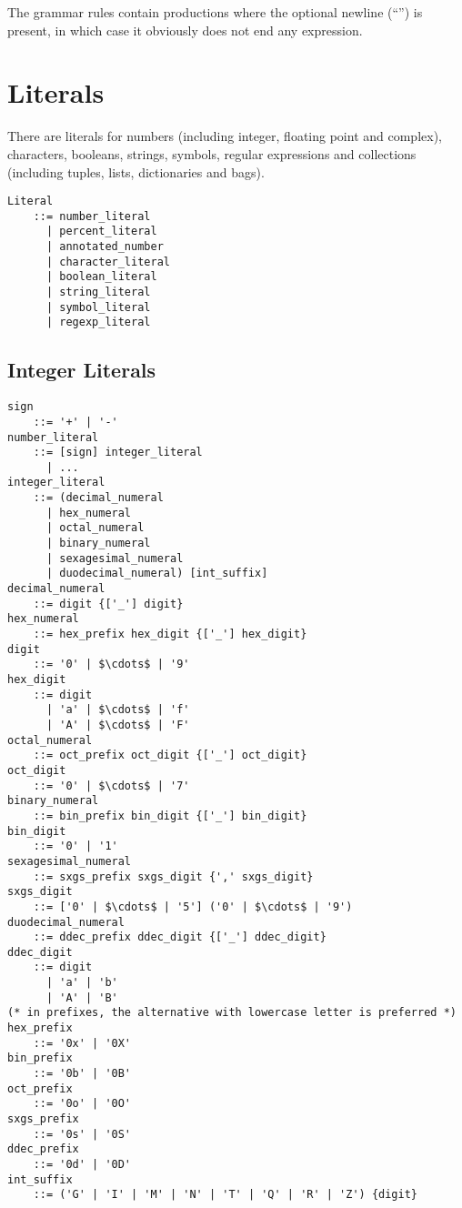 The grammar rules contain productions where the optional newline (``\code{[nl]}'') is present, in which case it obviously does not end any expression. 






\section{Literals}
\label{sec:literals}

There are literals for numbers (including integer, floating point and complex), characters, booleans, strings, symbols, regular expressions and collections (including tuples, lists, dictionaries and bags). 

\syntax\begin{lstlisting}
Literal 
    ::= number_literal
      | percent_literal
      | annotated_number
      | character_literal
      | boolean_literal
      | string_literal
      | symbol_literal
      | regexp_literal
\end{lstlisting}






\subsection{Integer Literals}
\label{sec:integerliterals}

\syntax\begin{lstlisting}
sign 
    ::= '+' | '-'
number_literal
    ::= [sign] integer_literal
      | ...
integer_literal 
    ::= (decimal_numeral
      | hex_numeral
      | octal_numeral
      | binary_numeral
      | sexagesimal_numeral
      | duodecimal_numeral) [int_suffix]
decimal_numeral
    ::= digit {['_'] digit}
hex_numeral
    ::= hex_prefix hex_digit {['_'] hex_digit}
digit 
    ::= '0' | $\cdots$ | '9'
hex_digit
    ::= digit 
      | 'a' | $\cdots$ | 'f' 
      | 'A' | $\cdots$ | 'F'
octal_numeral 
    ::= oct_prefix oct_digit {['_'] oct_digit}
oct_digit
    ::= '0' | $\cdots$ | '7'
binary_numeral 
    ::= bin_prefix bin_digit {['_'] bin_digit}
bin_digit
    ::= '0' | '1'
sexagesimal_numeral
    ::= sxgs_prefix sxgs_digit {',' sxgs_digit}
sxgs_digit
    ::= ['0' | $\cdots$ | '5'] ('0' | $\cdots$ | '9')
duodecimal_numeral
    ::= ddec_prefix ddec_digit {['_'] ddec_digit}
ddec_digit
    ::= digit 
      | 'a' | 'b'
      | 'A' | 'B'
(* in prefixes, the alternative with lowercase letter is preferred *)
hex_prefix
    ::= '0x' | '0X' 
bin_prefix
    ::= '0b' | '0B'
oct_prefix
    ::= '0o' | '0O'
sxgs_prefix
    ::= '0s' | '0S'
ddec_prefix
    ::= '0d' | '0D'
int_suffix
    ::= ('G' | 'I' | 'M' | 'N' | 'T' | 'Q' | 'R' | 'Z') {digit}
\end{lstlisting}

